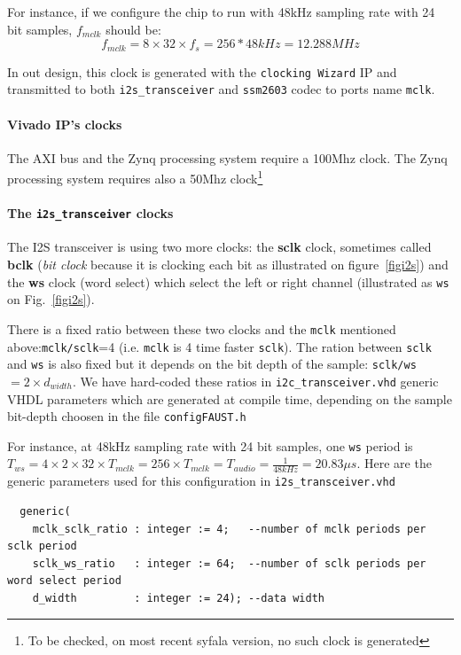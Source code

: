 \documentclass[11pt]{article}
\numberwithin{equation}{section}
\numberwithin{figure}{section}
\newcommand{\todo}[1]{\footnote{#1}}
\begin{document}
For instance, if  we configure the chip to run with 48kHz sampling rate with 24 bit samples, $f_{mclk}$ should be: $$f_{mclk}=8 \times 32 \times f_s=256*48kHz =12.288MHz$$

In out design, this clock is generated with the {\tt clocking Wizard} IP and transmitted to both {\tt i2s\_transceiver} and {\tt ssm2603}  codec to ports name {\tt mclk}.

\paragraph{Vivado IP's clocks}
The AXI bus and the Zynq processing system require a 100Mhz clock. The Zynq processing system requires also a 50Mhz clock\todo{To be checked, on most recent syfala version, no such clock is generated}


\paragraph{The {\tt i2s\_transceiver} clocks}
The I2S transceiver is using two more clocks: the {\bf sclk} clock, sometimes called  {\bf bclk} ({\em bit clock} because it is clocking each bit as illustrated on figure~\ref{figi2s}) and the {\bf ws} clock (word select) which select the left or right channel (illustrated as {\tt ws} on Fig.~\ref{figi2s}).

There is a fixed ratio between these two clocks and the {\tt mclk} mentioned above:{\tt mclk/sclk}=4 (i.e. {\tt mclk} is 4 time faster {\tt sclk}). The ration between {\tt sclk} and {\tt ws} is also fixed but it depends on the bit depth of the sample: {\tt sclk/ws}$=2\times d_{width}$. We have hard-coded these ratios  in {\tt i2c\_transceiver.vhd} generic VHDL parameters which are generated at compile time, depending on the sample bit-depth choosen in the file {\tt configFAUST.h}

For instance, at  48kHz sampling rate with 24 bit samples,  one {\tt ws} period is $T_{ws}=4\times 2\times 32\times T_{mclk}=256\times T_{mclk}=T_{audio}=\frac{1}{48kHz}=20.83\mu s$. Here are the generic parameters used for this configuration in {\tt i2s\_transceiver.vhd}

{\small
\begin{verbatim}
  generic(
    mclk_sclk_ratio : integer := 4;   --number of mclk periods per sclk period
    sclk_ws_ratio   : integer := 64;  --number of sclk periods per word select period
    d_width         : integer := 24); --data width
\end{verbatim}
}
\end{document}
